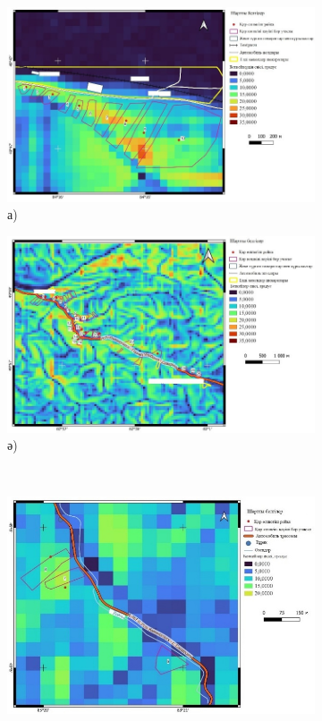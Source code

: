 \begin{figure}[H]
    \centering
    \begin{subfigure}[t]{0.42\textwidth}
        \centering
        \includegraphics[width=\textwidth]{media/ict2/image219}
        \caption*{а)}
    \end{subfigure}
    \begin{subfigure}[t]{0.42\textwidth}
        \centering
        \includegraphics[width=\textwidth]{media/ict2/image220}
        \caption*{ә)}
    \end{subfigure}
    \\
    \begin{subfigure}[t]{0.42\textwidth}
        \centering
        \includegraphics[width=\textwidth]{media/ict2/image221}

\end{subfigure}
\end{figure}
